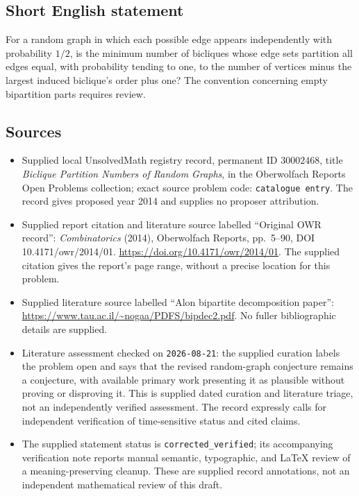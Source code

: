 \documentclass[11pt]{article}
\begin{document}
\subsection{Short English statement}
For a random graph in which each possible edge appears independently with probability \(1/2\), is the minimum number of bicliques whose edge sets partition all edges equal, with probability tending to one, to the number of vertices minus the largest induced biclique's order plus one? The convention concerning empty bipartition parts requires review.
\subsection{Sources}
\begin{itemize}
\item Supplied local UnsolvedMath registry record, permanent ID \(30002468\), title \emph{Biclique Partition Numbers of Random Graphs}, in the Oberwolfach Reports Open Problems collection; exact source problem code: \texttt{catalogue entry}. The record gives proposed year 2014 and supplies no proposer attribution.
\item Supplied report citation and literature source labelled ``Original OWR record'': \emph{Combinatorics} (2014), Oberwolfach Reports, pp.~5--90, DOI 10.4171/owr/2014/01. \url{https://doi.org/10.4171/owr/2014/01}. The supplied citation gives the report's page range, without a precise location for this problem.
\item Supplied literature source labelled ``Alon bipartite decomposition paper'': \url{https://www.tau.ac.il/~nogaa/PDFS/bipdec2.pdf}. No fuller bibliographic details are supplied.
\item Literature assessment checked on \texttt{2026-08-21}: the supplied curation labels the problem open and says that the revised random-graph conjecture remains a conjecture, with available primary work presenting it as plausible without proving or disproving it. This is supplied dated curation and literature triage, not an independently verified assessment. The record expressly calls for independent verification of time-sensitive status and cited claims.
\item The supplied statement status is \texttt{corrected\_verified}; its accompanying verification note reports manual semantic, typographic, and LaTeX review of a meaning-preserving cleanup. These are supplied record annotations, not an independent mathematical review of this draft.
\end{itemize}
\end{document}
